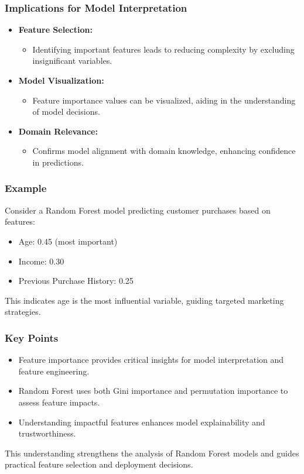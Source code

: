 \documentclass[aspectratio=169]{beamer}
\begin{document}
\begin{frame}[fragile]
    \frametitle{Implications for Model Interpretation}
    \begin{itemize}
        \item \textbf{Feature Selection:} 
            \begin{itemize}
                \item Identifying important features leads to reducing complexity by excluding insignificant variables.
            \end{itemize}
        \item \textbf{Model Visualization:} 
            \begin{itemize}
                \item Feature importance values can be visualized, aiding in the understanding of model decisions.
            \end{itemize}
        \item \textbf{Domain Relevance:} 
            \begin{itemize}
                \item Confirms model alignment with domain knowledge, enhancing confidence in predictions.
            \end{itemize}
    \end{itemize}
\end{frame}

\begin{frame}[fragile]
    \frametitle{Example}
    Consider a Random Forest model predicting customer purchases based on features:
    \begin{itemize}
        \item Age: 0.45 (most important)
        \item Income: 0.30
        \item Previous Purchase History: 0.25
    \end{itemize}
    This indicates age is the most influential variable, guiding targeted marketing strategies.
\end{frame}

\begin{frame}[fragile]
    \frametitle{Key Points}
    \begin{itemize}
        \item Feature importance provides critical insights for model interpretation and feature engineering.
        \item Random Forest uses both Gini importance and permutation importance to assess feature impacts.
        \item Understanding impactful features enhances model explainability and trustworthiness.
    \end{itemize}
    This understanding strengthens the analysis of Random Forest models and guides practical feature selection and deployment decisions.
\end{frame}
\end{document}

